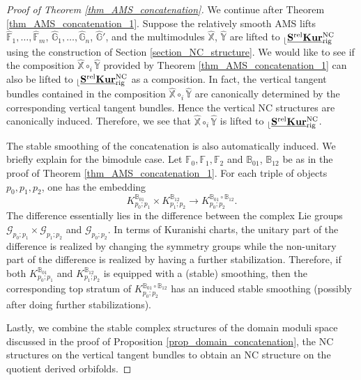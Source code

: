 \documentclass[reqno, 10pt]{amsart}
\numberwithin{equation}{section}
\numberwithin{equation}{section}
\theoremstyle{definition}
\theoremstyle{remark}
\newcommand{\beqn}{\begin{equation*}}
\newcommand{\eeqn}{\end{equation*}}
\newcommand{\mb}{\mathbb}
\newcommand{\mc}{\mathcal}
\renewcommand{\outer}{{}_{\lfloor}}
\newcommand{\uds}[1]{\underline{\smash{#1}}}
\begin{document}
\begin{proof}[Proof of Theorem \ref{thm_AMS_concatenation}]
We continue after Theorem \ref{thm_AMS_concatenation_1}. Suppose the relatively smooth AMS lifts $\hat {\mb F}_1, \ldots, \hat {\mb F}_m$,  $\hat{\mb G}_1, \ldots, \hat {\mb G}_n$, $\hat {\mb G}'$, and the multimodules $\hat {\mb X}$, $\hat {\mb Y}$ are lifted to $\outer \uds{\bf S^{\rm rel} Kur}_{\rm rig}^{\rm NC}$ using the construction of Section \ref{section_NC_structure}. We would like to see if the composition $\hat {\mb X} \circ_i \hat {\mb Y}$ provided by Theorem \ref{thm_AMS_concatenation_1} can also be lifted to $\outer \uds{\bf S^{\rm rel} Kur}_{\rm rig}^{\rm NC}$ as a composition. In fact, the vertical tangent bundles contained in the composition $\hat {\mb X} \circ_i \hat {\mb Y}$ are canonically determined by the corresponding vertical tangent bundles. Hence the vertical NC structures are canonically induced. Therefore, we see that $\hat {\mb X} \circ_i \hat {\mb Y}$ is lifted to $\outer \uds{\bf S^{\rm rel} Kur}_{\rm rig}^{\rm NC}$. 

The stable smoothing of the concatenation is also automatically induced. We briefly explain for the bimodule case. Let ${\mb F}_0, {\mb F}_1, {\mb F}_2$ and $\mb{B}_{01}$, $\mb{B}_{12}$ be as in the proof of Theorem \ref{thm_AMS_concatenation_1}. For each triple of objects $p_0, p_1, p_2$, one has the embedding
\beqn
K_{p_0; p_1}^{\mb{B}_{01}} \times K_{p_1; p_2}^{\mb{B}_{12}} \to K_{p_0; p_2}^{\mb{B}_{01} \circ \mb{B}_{12}}.
\eeqn
The difference essentially lies in the difference between the complex Lie groups ${\mc G}_{p_0; p_1}\times {\mc G}_{p_1; p_2}$ and ${\mc G}_{p_0; p_2}$. In terms of Kuranishi charts, the unitary part of the difference is realized by changing the symmetry groups while the non-unitary part of the difference is realized by having a further stabilization. Therefore, if both $K_{p_0; p_1}^{\mb{B}_{01}}$ and $K_{p_1; p_2}^{\mb{B}_{12}}$ is equipped with a (stable) smoothing, then the corresponding top stratum of $K_{p_0; p_2}^{\mb{B}_{01} \circ \mb{B}_{12}}$ has an induced stable smoothing (possibly after doing further stabilizations). 

Lastly, we combine the stable complex structures of the domain moduli space discussed in the proof of Proposition \ref{prop_domain_concatenation}, the NC structures on the vertical tangent bundles to obtain an NC structure on the quotient derived orbifolds.
\end{proof}
\end{document}
